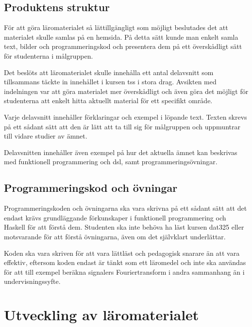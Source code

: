 \documentclass[12pt,a4paper,twoside,openright]{article}
\begin{document}
\subsection{Produktens struktur}
\label{sec:prodSpec}
För att göra läromaterialet så lättillgängligt som möjligt beslutades
det
att materialet skulle samlas på en hemsida. På detta sätt kunde man
enkelt samla text, bilder och programmeringskod och presentera dem på
ett överskådligt sätt för studenterna i målgruppen.

Det beslöts att läromaterialet skulle innehålla ett antal delavsnitt
som tillsammans täckte in innehållet i kursen \gls{tss} i stora drag.
Avsikten med indelningen var att göra materialet mer överskådligt och
även göra det möjligt för studenterna att enkelt hitta aktuellt
material för ett specifikt område.

Varje delavsnitt innehåller förklaringar och exempel i löpande
text. Texten skrevs på ett sådant sätt att den är lätt att ta till sig
för målgruppen och uppmuntrar till vidare studier av ämnet.

Delavsnitten innehåller även exempel på hur det aktuella ämnet kan
beskrivas med funktionell programmering och \gls{dsl}, samt
programmeringsövningar.

\subsection{Programmeringskod och övningar}

Programmeringskoden och övningarna ska vara skrivna på ett sådant sätt att
det endast krävs grundläggande förkunskaper i funktionell
programmering och Haskell för att förstå dem. Studenten ska inte
behöva ha läst kursen \gls{dat325} eller motsvarande för att förstå
övningarna, även om det självklart underlättar.

Koden ska vara skriven för att vara lättläst och pedagogisk snarare
än att vara effektiv, eftersom koden endast är tänkt som ett läromedel
och inte ska användas för att till exempel beräkna signalers Fouriertransform
i andra sammanhang än i undervisningssyfte.

\newpage


\section{Utveckling av läromaterialet}
\label{sec:utveckling}
\end{document}
